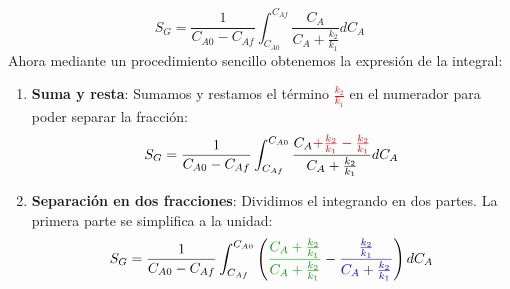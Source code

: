 \begin{equation}
  S_G = \frac{1}{C_{A0}-C_{Af}} \int_{C_{A0}}^{C_{Af}} \frac{C_A}{C_A + \frac{k_2}{k_1}} dC_A
\end{equation}
\noindent Ahora mediante un procedimiento sencillo obtenemos la expresión de la integral:
\begin{enumerate}
  \item \textbf{Suma y resta}: Sumamos y restamos el término \textcolor{red}{$\frac{k_2}{k_1}$} en el numerador para poder separar la fracción:
        \begin{equation}
          S_G = \frac{1}{C_{A0}-C_{Af}} \int_{C_{Af}}^{C_{A0}} \frac{C_A \textcolor{red}{ + \frac{k_2}{k_1} - \frac{k_2}{k_1}}}{C_A + \frac{k_2}{k_1}} dC_A
        \end{equation}

  \item \textbf{Separación en dos fracciones}: Dividimos el integrando en dos partes. La primera parte se simplifica a la unidad:
        \begin{equation}
          S_G = \frac{1}{C_{A0}-C_{Af}} \int_{C_{Af}}^{C_{A0}} \left(\textcolor{darkgreen}{\frac{C_A + \frac{k_2}{k_1}}{C_A + \frac{k_2}{k_1}}} -\textcolor{blue}{\frac{\frac{k_2}{k_1}}{C_A + \frac{k_2}{k_1}}} \right) dC_A
        \end{equation}


\end{enumerate}
